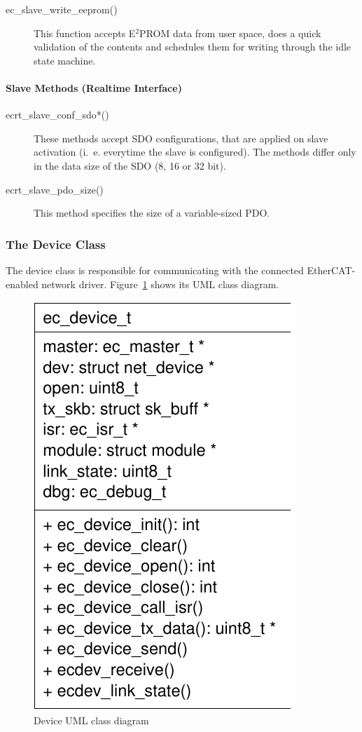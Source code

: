 \documentclass[a4paper,12pt,BCOR6mm,bibtotoc,idxtotoc]{scrbook}
\begin{document}
\begin{description}
\item[ec\_slave\_write\_eeprom()] This function accepts E$^2$PROM data
  from user space, does a quick validation of the contents and
  schedules them for writing through the idle state machine.
\end{description}

\paragraph{Slave Methods (Realtime Interface)}

\begin{description}
\item[ecrt\_slave\_conf\_sdo*()] These methods accept SDO
  configurations, that are applied on slave activation (i.~e.
  everytime the slave is configured). The methods differ only in the
  data size of the SDO (8, 16 or 32 bit).
\item[ecrt\_slave\_pdo\_size()] This method specifies the size of a
  variable-sized PDO.
\end{description}


\subsubsection{The Device Class}
\label{sec:class-device}

The device class is responsible for communicating with the connected
EtherCAT-enabled network driver. Figure~\ref{fig:uml-device} shows its
UML class diagram.

\begin{figure}[htbp]
  \centering
  \includegraphics[width=.3\textwidth]{images/uml-device}
  \caption{Device UML class diagram}
  \label{fig:uml-device}
\end{figure}
\end{document}
